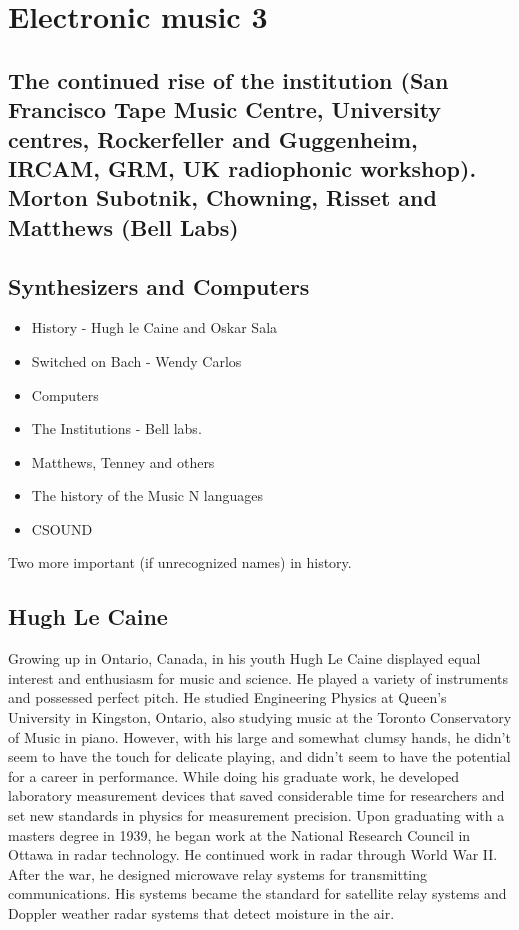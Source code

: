 
\chapter{Electronic music 3}
\label{history3}


\section{The continued rise of the institution (San Francisco Tape Music Centre, University centres, Rockerfeller and Guggenheim, IRCAM, GRM, UK radiophonic workshop). Morton Subotnik, Chowning, Risset and Matthews (Bell Labs)}

\section{Synthesizers and Computers}
\begin{itemize}
\item History - Hugh le Caine and Oskar Sala
\item Switched on Bach - Wendy Carlos
\item Computers
\item The Institutions - Bell labs.
\item Matthews, Tenney and others
\item The history of the Music N languages
\item CSOUND
\end{itemize}

Two more important (if unrecognized names) in history.

\section{Hugh Le Caine}
Growing up in Ontario, Canada, in his youth Hugh Le Caine displayed equal interest and enthusiasm for music and science. He played a variety of instruments and possessed perfect pitch. He studied Engineering Physics at Queen's University in Kingston, Ontario, also studying music at the Toronto Conservatory of Music in piano. However, with his large and somewhat clumsy hands, he didn't seem to have the touch for delicate playing, and didn't seem to have the potential for a career in performance.
While doing his graduate work, he developed laboratory measurement devices that saved considerable time for researchers and set new standards in physics for measurement precision. Upon graduating with a masters degree in 1939, he began work at the National Research Council in Ottawa in radar technology. He continued work in radar through World War II. After the war, he designed microwave relay systems for transmitting communications. His systems became the standard for satellite relay systems and Doppler weather radar systems that detect moisture in the air.

